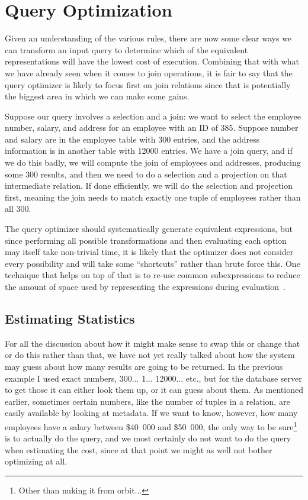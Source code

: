 




\section*{Query Optimization}

Given an understanding of the various rules, there are now some clear ways we can transform an input query to determine which of the equivalent representations will have the lowest cost of execution. Combining that with what we have already seen when it comes to join operations, it is fair to say that the query optimizer is likely to focus first on join relations since that is potentially the biggest area in which we can make some gains.

Suppose our query involves a selection and a join: we want to select the employee number, salary, and address for an employee with an ID of 385. Suppose number and salary are in the employee table with 300 entries, and the address information is in another table with 12000 entries. We have a join query, and if we do this badly, we will compute the join of employees and addresses, producing some 300 results, and then we need to do a selection and a projection on that intermediate relation. If done efficiently, we will do the selection and projection first, meaning the join needs to match exactly one tuple of employees rather than all 300. 

The query optimizer should systematically generate equivalent expressions, but since performing all possible transformations and then evaluating each option may itself take non-trivial time, it is likely that the optimizer does not consider every possibility and will take some ``shortcuts'' rather than brute force this. One technique that helps on top of that is to re-use common subexpressions to reduce the amount of space used by representing the expressions during evaluation~\cite{dsc}.

\subsection*{Estimating Statistics}

For all the discussion about how it might make sense to swap this or change that or do this rather than that, we have not yet really talked about how the system may guess about how many results are going to be returned. In the previous example I used exact numbers, 300... 1... 12000... etc., but for the database server to get those it can either look them up, or it can guess about them. As mentioned earlier, sometimes certain numbers, like the number of tuples in a relation, are easily available by looking at metadata. If we want to know, however, how many employees have a salary between \$40~000 and \$50~000, the only way to be sure\footnote{Other than nuking it from orbit...} is to actually do the query, and we most certainly do not want to do the query when estimating the cost, since at that point we might as well not bother optimizing at all.

